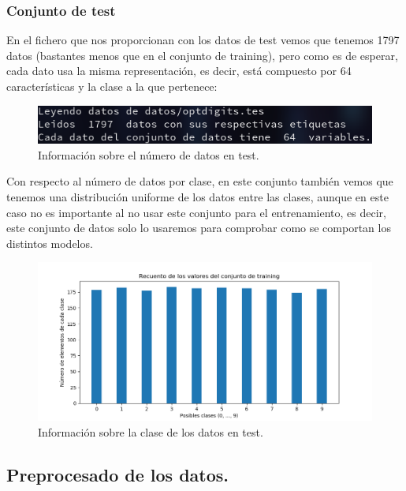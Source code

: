 \documentclass[12pt, spanish]{article}
\begin{document}
\subsubsection{Conjunto de test}

En el fichero que nos proporcionan con los datos de test vemos que tenemos 1797 datos (bastantes menos que en el conjunto de training), pero como es de esperar, cada dato usa la misma representación, es decir, está compuesto por 64 características y la clase a la que pertenece:

\begin{figure}[H]
	\centering
	\includegraphics[scale=0.7]{clasificacion/num_datos_test.png}
	\caption{Información sobre el número de datos  en test.}
	\label{datosClasificacionTest}
\end{figure}


Con respecto al número de datos por clase, en este conjunto también vemos que tenemos una distribución uniforme de los datos entre las clases, aunque en este caso no es importante al no usar este conjunto para el entrenamiento, es decir, este conjunto de datos solo lo usaremos para comprobar como se comportan los distintos modelos.

\begin{figure}[H]
	\centering
	\includegraphics[scale=0.7]{clasificacion/datos_test.png}
	\caption{Información sobre la clase de los datos en test.}
	\label{claseDatosTestClasificacion}
\end{figure}


\subsection{Preprocesado de los datos.}
\end{document}
